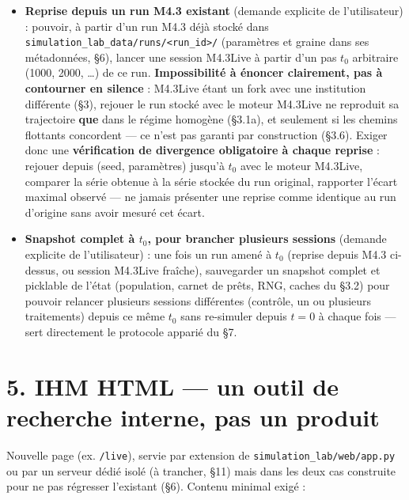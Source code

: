 \documentclass[11pt,a4paper]{article}
\newcommand{\code}[1]{\texttt{#1}}
\begin{document}
\begin{itemize}
  l'afficher clairement côté IHM.
\item \textbf{Reprise depuis un run M4.3 existant} (demande explicite de
  l'utilisateur) : pouvoir, à partir d'un run M4.3 déjà stocké dans
  \code{simulation\_lab\_data/runs/<run\_id>/} (paramètres et graine dans
  ses métadonnées, \S6), lancer une session M4.3Live à partir d'un pas
  $t_0$ arbitraire (1000, 2000, \ldots) de ce run. \textbf{Impossibilité
  à énoncer clairement, pas à contourner en silence} : M4.3Live étant un
  fork avec une institution différente (\S3), rejouer le run stocké avec
  le moteur M4.3Live ne reproduit sa trajectoire \textbf{que} dans le
  régime homogène (\S3.1a), et seulement si les chemins flottants
  concordent --- ce n'est pas garanti par construction (\S3.6). Exiger
  donc une \textbf{vérification de divergence obligatoire à chaque
  reprise} : rejouer depuis (seed, paramètres) jusqu'à $t_0$ avec le
  moteur M4.3Live, comparer la série obtenue à la série stockée du run
  original, rapporter l'écart maximal observé --- ne jamais présenter
  une reprise comme identique au run d'origine sans avoir mesuré cet
  écart.
\item \textbf{Snapshot complet à $t_0$, pour brancher plusieurs
  sessions} (demande explicite de l'utilisateur) : une fois un run amené
  à $t_0$ (reprise depuis M4.3 ci-dessus, ou session M4.3Live fraîche),
  sauvegarder un snapshot complet et picklable de l'état (population,
  carnet de prêts, RNG, caches du \S3.2) pour pouvoir relancer plusieurs
  sessions différentes (contrôle, un ou plusieurs traitements) depuis ce
  même $t_0$ sans re-simuler depuis $t=0$ à chaque fois --- sert
  directement le protocole apparié du \S7.
\end{itemize}

\section*{5. IHM HTML --- un outil de recherche interne, pas un produit}

Nouvelle page (ex. \code{/live}), servie par extension de
\code{simulation\_lab/web/app.py} ou par un serveur dédié isolé (à
trancher, \S11) mais dans les deux cas construite pour ne pas régresser
l'existant (\S6). Contenu minimal exigé :
\end{document}
